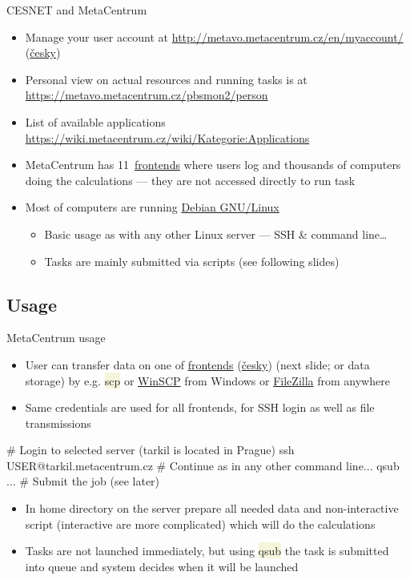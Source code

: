 \documentclass[compress, ucs, xelatex, 11pt, xcolor=svgnames, aspectratio=169,
	hyperref={
		bookmarks=true,
		unicode=true,
		colorlinks=true,
		pdftitle={Linux, command line and MetaCentrum},
		plainpages=false,
		pdfauthor={Vojtech Zeisek},
		pdfsubject={Course about use of Linux command line, writing shell scripts and using MetaCentrum of CESNET},
		pdfcreator={XeLaTeX},
		pdfkeywords={Linux, GNU, BASH, shell, command line, MetaCentrum},
		linkcolor=DarkRed, %
		anchorcolor=DarkBlue, %
		citecolor=Indigo, %
		filecolor=NavyBlue, %
		menucolor=DarkMagenta, %
		urlcolor=DarkBlue, %
		pdftex},
	url={hyphens, lowtilde} %
	]{beamer}
\renewcommand{\texttt}[1]{\colorbox{Beige}{{\ttfamily #1}}}
\begin{document}
\begin{frame}[allowframebreaks]{CESNET and MetaCentrum}
\begin{itemize}
		\item Manage your user account at \url{http://metavo.metacentrum.cz/en/myaccount/} (\href{https://metavo.metacentrum.cz/cs/myaccount/}{česky})
		\item Personal view on actual resources and running tasks is at \url{https://metavo.metacentrum.cz/pbsmon2/person}
		\item List of available applications \url{https://wiki.metacentrum.cz/wiki/Kategorie:Applications}
		\item MetaCentrum has 11~\href{https://wiki.metacentrum.cz/wiki/Frontend}{frontends} where users log and thousands of computers doing the calculations --- they are not accessed directly to run task
		\item Most of computers are running \href{https://www.debian.org/}{Debian GNU/Linux}
		\begin{itemize}
			\item Basic usage as with any other Linux server --- SSH \& command line\ldots
			\item Tasks are mainly submitted via scripts (see following slides)
		\end{itemize}
	\end{itemize}
\end{frame}

\subsection{Usage}

\begin{frame}[fragile]{MetaCentrum usage}
	\begin{itemize}
		\item User can transfer data on one of \href{https://wiki.metacentrum.cz/wiki/Frontend}{frontends} (\href{https://wiki.metacentrum.cz/wiki/Celni_uzel}{česky}) (next slide; or data storage) by e.g. \texttt{scp} or \href{https://winscp.net/}{WinSCP} from Windows or \href{https://filezilla-project.org/}{FileZilla} from anywhere
		\item Same credentials are used for all frontends, for SSH login as well as file transmissions
	\end{itemize}
	\vfill
	\begin{bashcode}
    # Login to selected server (tarkil is located in Prague)
    ssh USER@tarkil.metacentrum.cz
    # Continue as in any other command line...
    qsub ... # Submit the job (see later)
	\end{bashcode}
	\vfill
	\begin{itemize}
		\item In home directory on the server prepare all needed data and non-interactive script (interactive are more complicated) which will do the calculations
		\item Tasks are not launched immediately, but using \texttt{qsub} the task is submitted into queue and system decides when it will be launched
	\end{itemize}
\end{frame}
\end{document}
